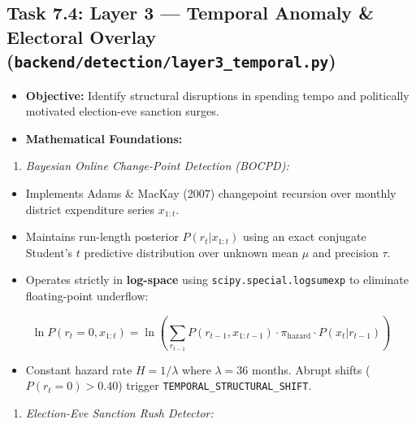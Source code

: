 \documentclass[11pt,a4paper]{article}
\begin{document}
\subsection{Task 7.4: Layer 3 --- Temporal Anomaly \& Electoral Overlay (\texttt{backend/detection/layer3\_temporal.py})}
\begin{itemize}[leftmargin=1.5em, itemsep=2pt, topsep=3pt]
\item \textbf{Objective:} Identify structural disruptions in spending tempo and politically motivated election-eve sanction surges.
\item \textbf{Mathematical Foundations:}
\end{itemize}
\begin{enumerate}[leftmargin=1.5em, itemsep=2pt, topsep=3pt]
\item \textit{Bayesian Online Change-Point Detection (BOCPD):}
\end{enumerate}
\begin{itemize}[leftmargin=1.5em, itemsep=2pt, topsep=3pt]
\item Implements Adams \& MacKay (2007) changepoint recursion over monthly district expenditure series $x_{1:t}$.
\item Maintains run-length posterior $P(r_t | x_{1:t})$ using an exact conjugate Student's $t$ predictive distribution over unknown mean $\mu$ and precision $\tau$.
\item Operates strictly in \textbf{log-space} using \texttt{scipy.special.logsumexp} to eliminate floating-point underflow:
\end{itemize}
\[ \ln P(r_t=0, x_{1:t}) = \ln \left( \sum_{r_{t-1}} P(r_{t-1}, x_{1:t-1}) \cdot \pi_{\text{hazard}} \cdot P(x_t | r_{t-1}) \right) \]
\begin{itemize}[leftmargin=1.5em, itemsep=2pt, topsep=3pt]
\item Constant hazard rate $H = 1/\lambda$ where $\lambda = 36$ months. Abrupt shifts ($P(r_t = 0) > 0.40$) trigger \texttt{TEMPORAL\_STRUCTURAL\_SHIFT}.
\end{itemize}
\begin{enumerate}[leftmargin=1.5em, itemsep=2pt, topsep=3pt]
\item \textit{Election-Eve Sanction Rush Detector:}
\end{enumerate}
\end{document}
